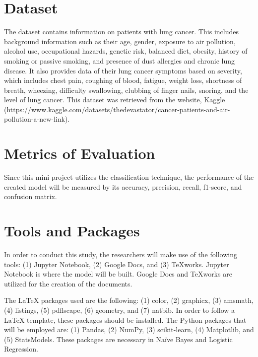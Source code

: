 \documentclass[runningheads]{llncs}
\begin{document}
\section{Dataset}

The dataset contains information on patients with lung cancer. This includes background information such as their age, gender, exposure to air pollution, alcohol use, occupational hazards, genetic risk, balanced diet, obesity, history of smoking or passive smoking, and presence of dust allergies and chronic lung disease. It also provides data of their lung cancer symptoms based on severity, which includes chest pain, coughing of blood, fatigue, weight loss, shortness of breath, wheezing, difficulty swallowing, clubbing of finger nails, snoring, and the level of lung cancer. This dataset was retrieved from the website, Kaggle (https://www.kaggle.com/datasets/thedevastator/cancer-patients-and-air-pollution-a-new-link). 

\section{Metrics of Evaluation}

Since this mini-project utilizes the classification technique, the performance of the created model will be measured by its accuracy, precision, recall, f1-score, and confusion matrix.

\section{Tools and Packages}

In order to conduct this study, the researchers will make use of the following tools: (1) Jupyter Notebook, (2) Google Docs, and (3) TeXworks. Jupyter Notebook is where the model will be built. Google Docs and TeXworks are utilized for the creation of the documents. 

The LaTeX packages used are the following: (1) color, (2) graphicx, (3) amsmath, (4) listings, (5) pdflscape, (6) geometry, and (7) natbib. In order to follow a LaTeX template, these packages should be installed. The Python packages that will be employed are: (1) Pandas, (2) NumPy, (3) scikit-learn, (4) Matplotlib, and (5) StatsModels. These packages are necessary in Naïve Bayes and Logistic Regression. 



\end{document}
